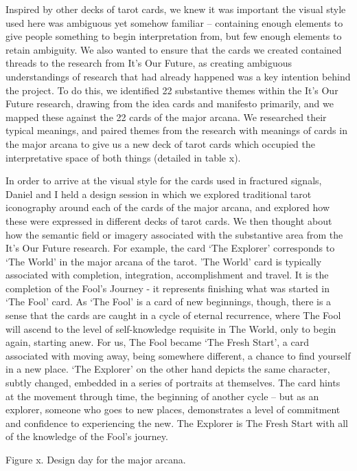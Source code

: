 Inspired by other decks of tarot cards, we knew it was important the visual style used here was ambiguous yet somehow familiar – containing enough elements to give people something to begin interpretation from, but few enough elements to retain ambiguity. We also wanted to ensure that the cards we created contained threads to the research from It’s Our Future, as creating ambiguous understandings of research that had already happened was a key intention behind the project. To do this, we identified 22 substantive themes within the It’s Our Future research, drawing from the idea cards and manifesto primarily, and we mapped these against the 22 cards of the major arcana. We researched their typical meanings, and paired themes from the research with meanings of cards in the major arcana to give us a new deck of tarot cards which occupied the interpretative space of both things (detailed in table x).


 
In order to arrive at the visual style for the cards used in fractured signals, Daniel and I held a design session in which we explored traditional tarot iconography around each of the cards of the major arcana, and explored how these were expressed in different decks of tarot cards. We then thought about how the semantic field or imagery associated with the substantive area from the It’s Our Future research. For example, the card ‘The Explorer’ corresponds to ‘The World’ in the major arcana of the tarot. ’The World’ card is typically associated with completion, integration, accomplishment and travel. It is the completion of the Fool’s Journey -  it represents finishing what was started in ‘The Fool’ card. As ‘The Fool’ is a card of new beginnings, though, there is a sense that the cards are caught in a cycle of eternal recurrence, where The Fool will ascend to the level of self-knowledge requisite in The World, only to begin again, starting anew. For us, The Fool became ‘The Fresh Start’, a card associated with moving away, being somewhere different, a chance to find yourself in a new place. ‘The Explorer’ on the other hand depicts the same character, subtly changed, embedded in a series of portraits at themselves. The card hints at the movement through time, the beginning of another cycle – but as an explorer, someone who goes to new places, demonstrates a level of commitment and confidence to experiencing the new. The Explorer is The Fresh Start with all of the knowledge of the Fool’s journey. 

Figure x. Design day for the major arcana.

